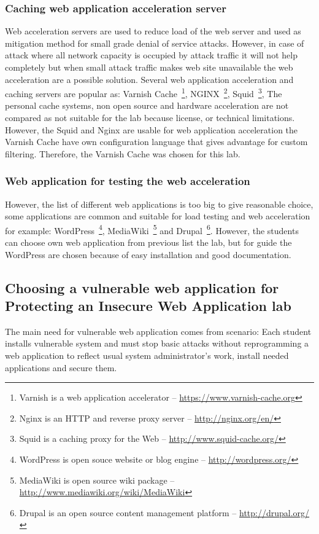 \subsubsection{Caching web application acceleration server}
Web acceleration servers are used to reduce load of the web server and used as mitigation method for small grade denial of service attacks. However, in case of attack where all network capacity is occupied by attack traffic it will not help completely but when small attack traffic makes web site unavailable the web acceleration are a possible solution. Several web application acceleration and caching servers are popular as: Varnish Cache~\footnote{Varnish is a web application accelerator -- \url{https://www.varnish-cache.org}}, NGINX~\footnote{Nginx is an HTTP and reverse proxy server -- \url{http://nginx.org/en/}}, Squid~\footnote{Squid is a caching proxy for the Web -- \url{http://www.squid-cache.org/}},
The personal cache systems, non open source and hardware acceleration are not compared as not suitable for the lab because license, or technical limitations.
However, the Squid and Nginx are usable for web application acceleration the Varnish Cache have own configuration language that gives advantage for custom filtering. Therefore, the Varnish Cache was chosen for this lab.

\subsubsection{Web application for testing the web acceleration}
However, the list of different web applications is too big to give reasonable choice, some applications are common and suitable for load testing and web acceleration for example: WordPress~\footnote{WordPress is open souce website or blog engine -- \url{http://wordpress.org/}}, MediaWiki~\footnote{MediaWiki is open source wiki package -- \url{http://www.mediawiki.org/wiki/MediaWiki}} and  Drupal~\footnote{Drupal is an open source content management platform -- \url{http://drupal.org/}}. However, the students can choose own web application from previous list the lab, but for guide the WordPress are chosen because of easy installation and good documentation.


\subsection{Choosing a vulnerable web application for Protecting an Insecure Web Application lab}

The main need for vulnerable web application comes from scenario: Each student installs vulnerable system and must stop basic attacks without reprogramming a web application to reflect usual system administrator's work,  install needed applications and secure them.

